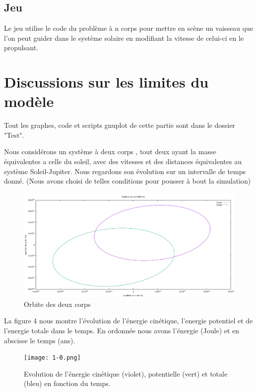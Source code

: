 \documentclass[a4paper]{article}
\begin{document}
\subsection{Jeu}

Le jeu utilise le code du problème à n corps pour mettre en scène un vaisseau que l'on peut guider dans le système solaire en modifiant la vitesse de celui-ci en le propulsant.

\newpage

\section{Discussions sur les limites du modèle}
\label{sec:Discussion sur les limites du modèle}

Tout les graphes, code et scripts gnuplot de cette partie sont dans le dossier "Test".
\newline

Nous considérons un système à deux corps , tout deux ayant la masse équivalentes a celle du soleil, avec des vitesses et des distances équivalentes au système Soleil-Jupiter. Nous regardons son évolution  sur un intervalle de temps donné. (Nous avons choisi de telles conditions pour pousser à bout la simulation)

\begin{figure}[h]
\centering
\includegraphics[width=\textwidth]{2.png}
\caption{Orbite des deux corps}
\end{figure}

La figure 4 nous montre l'évolution de l'énergie cinétique, l'energie potentiel et de l'energie totale dans le temps. En ordonnée nous avons l'énergie  (Joule) et en abscisse le temps (ans).

\begin{figure}[h]
\centering
\texttt{[image: 1-0.png]}
\caption{Evolution de l'énergie cinétique (violet), potentielle (vert) et totale (bleu) en fonction du temps.}
\end{figure}
\newpage
\end{document}
